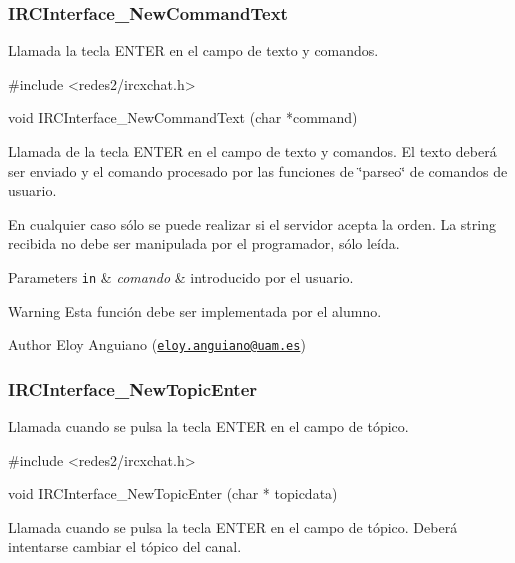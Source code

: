  \hypertarget{IRCInterface_NewCommandText}{}\subsubsection{I\+R\+C\+Interface\+\_\+\+New\+Command\+Text}\label{IRCInterface_NewCommandText}
Llamada la tecla E\+N\+T\+ER en el campo de texto y comandos.


\begin{DoxyCode}
\textcolor{preprocessor}{#include <redes2/ircxchat.h>}

\textcolor{keywordtype}{void} IRCInterface\_NewCommandText (\textcolor{keywordtype}{char} *command)
\end{DoxyCode}


Llamada de la tecla E\+N\+T\+ER en el campo de texto y comandos. El texto deberá ser enviado y el comando procesado por las funciones de \char`\"{}parseo\char`\"{} de comandos de usuario.

En cualquier caso sólo se puede realizar si el servidor acepta la orden. La string recibida no debe ser manipulada por el programador, sólo leída.


\begin{DoxyParams}[1]{Parameters}
\mbox{\tt in}  & {\em comando} & introducido por el usuario.\\
\hline
\end{DoxyParams}
\begin{DoxyWarning}{Warning}
Esta función debe ser implementada por el alumno.
\end{DoxyWarning}
\begin{DoxyAuthor}{Author}
Eloy Anguiano (\href{mailto:eloy.anguiano@uam.es}{\tt eloy.\+anguiano@uam.\+es})
\end{DoxyAuthor}


 \hypertarget{IRCInterface_NewTopicEnter}{}\subsubsection{I\+R\+C\+Interface\+\_\+\+New\+Topic\+Enter}\label{IRCInterface_NewTopicEnter}
Llamada cuando se pulsa la tecla E\+N\+T\+ER en el campo de tópico.


\begin{DoxyCode}
\textcolor{preprocessor}{#include <redes2/ircxchat.h>}

\textcolor{keywordtype}{void} IRCInterface\_NewTopicEnter (\textcolor{keywordtype}{char} * topicdata)
\end{DoxyCode}


Llamada cuando se pulsa la tecla E\+N\+T\+ER en el campo de tópico. Deberá intentarse cambiar el tópico del canal.

